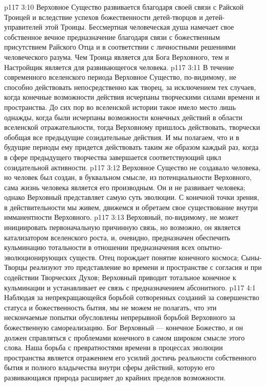 \vs p117 3:10 Верховное Существо развивается благодаря своей связи с Райской Троицей и вследствие успехов божественности детей\hyp{}творцов и детей\hyp{}управителей этой Троицы. Бессмертная человеческая душа намечает свое собственное вечное предназначение благодаря связи с божественным присутствием Райского Отца и в соответствии с личностными решениями человеческого разума. Чем Троица является для Бога Верховного, тем и Настройщик является для развивающегося человека.
\vs p117 3:11 \pc В течение современного вселенского периода Верховное Существо, по\hyp{}видимому, не способно действовать непосредственно как творец, за исключением тех случаев, когда конечные возможности действия исчерпаны творческими силами времени и пространства. До сих пор во вселенской истории такое имело место лишь однажды, когда были исчерпаны возможности конечных действий в области вселенской отражательности, тогда Верховному пришлось действовать, творчески обобщая все предыдущие созидательные действия. И мы полагаем, что и в будущие периоды ему придется действовать таким же образом каждый раз, когда в сфере предыдущего творчества завершается соответствующий цикл созидательной активности.
\vs p117 3:12 Верховное Существо не создавало человека, но человек был создан, в буквальном смысле, из потенциальности Верховного, сама жизнь человека является его производным. Он и не развивает человека; однако Верховный представляет самую суть эволюции. С конечной точки зрения, в действительности мы живем, движемся и обретаем свое существование внутри имманентности Верховного.
\vs p117 3:13 Верховный, по\hyp{}видимому, не может инициировать первоначальную причинную связь, но возможно, он является катализатором вселенского роста, и, очевидно, предназначен обеспечить кульминацию тотальности в отношении предназначения всех опытно\hyp{}эволюционирующих существ. Отец порождает понятие конечного космоса; Сыны\hyp{}Творцы реализуют это представление во времени и пространстве с согласия и при содействии Творческих Духов; Верховный приводит тотальное конечное к кульминации и устанавливает ее связь с предназначением абсонитного.
\vs p117 4:1 Наблюдая за непрекращающейся борьбой сотворенных созданий за совершенство статуса и божественность бытия, мы не можем не полагать, что эти нескончаемые попытки обусловлены непрерывной борьбой Верховного за божественную самореализацию. Бог Верховный --- конечное Божество, и он должен справляться с проблемами конечного в самом широком смысле этого слова. Наша борьба с превратностями времени в процессах эволюции пространства является отражением его усилий достичь реальности собственного бытия и полного владычества внутри сферы действий, которую его развивающаяся природа расширяет до крайних пределов возможности.

